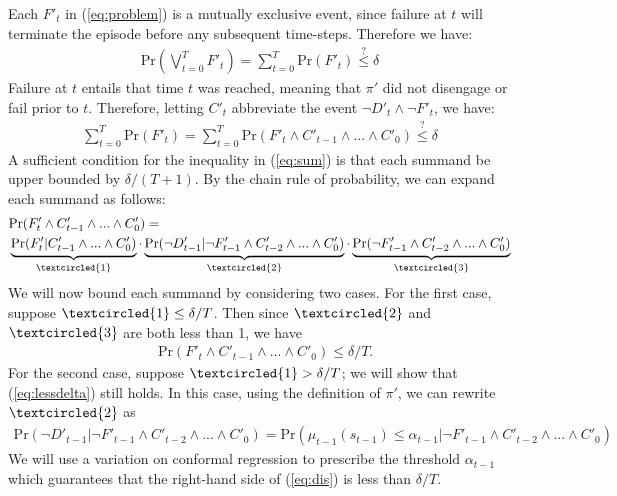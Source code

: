 \documentclass[12pt,letterpaper]{article}
\begin{document}
Each $F'_t$ in (\ref{eq:problem}) is a mutually exclusive event, since failure at $t$ will terminate the episode before any subsequent time-steps.  Therefore we have:
\begin{align}
\text{Pr}\left(\bigvee_{t=0}^T F'_t\right) = \sum_{t=0}^T \text{Pr}(F'_t) \overset{?}{\leq} \delta
\end{align}
Failure at $t$ entails that time $t$ was reached, meaning that $\pi'$ did not disengage or fail prior to $t$.  Therefore, letting $C'_t$ abbreviate the event $\neg D'_t\wedge\neg F'_t$, we have:
\begin{align}
\sum_{t=0}^T \text{Pr}(F'_t) = \sum_{t=0}^T \text{Pr}(F'_t \wedge  C'_{t-1}\wedge ... \wedge C'_0) \overset{?}{\leq} \delta\label{eq:sum}
\end{align}
A sufficient condition for the inequality in (\ref{eq:sum}) is that each summand be upper bounded by $\delta/(T+1)$.  By the chain rule of probability, we can expand each summand as follows:
\begin{align}
&\text{Pr}(F'_t \wedge  C'_{t-1}\wedge ... \wedge C'_0) = \\
& \underbrace{\text{Pr}(F'_t |  C'_{t-1}\wedge ... \wedge C'_0)}_{\textcircled{1}} \cdot \underbrace{\text{Pr}(\neg D'_{t-1}| \neg F'_{t-1}\wedge  C'_{t-2}\wedge ... \wedge C'_0)}_{\textcircled{2}} \cdot \underbrace{\text{Pr}(\neg F'_{t-1}\wedge  C'_{t-2}\wedge ... \wedge C'_0)}_{\textcircled{3}}
\end{align}
We will now bound each summand by considering two cases.  For the first case, suppose $\textcircled{1}\leq\delta/T$. Then since $\textcircled{2}$ and $\textcircled{3}$ are both less than 1, we have
\begin{align}
&\text{Pr}(F'_t \wedge  C'_{t-1}\wedge ... \wedge C'_0) \leq \delta/T.\label{eq:lessdelta}
\end{align}
For the second case, suppose $\textcircled{1}>\delta/T$; we will show that (\ref{eq:lessdelta}) still holds.  In this case, using the definition of $\pi'$, we can rewrite $\textcircled{2}$ as 
\begin{align}
\text{Pr}(\neg D'_{t-1}| \neg F'_{t-1}\wedge  C'_{t-2}\wedge ... \wedge C'_0) = \text{Pr}(\mu_{t-1}(s_{t-1}) \leq \alpha_{t-1}| \neg F'_{t-1}\wedge  C'_{t-2}\wedge ... \wedge C'_0)\label{eq:dis}
\end{align}
We will use a variation on conformal regression to prescribe the threshold $\alpha_{t-1}$ which guarantees that the right-hand side of (\ref{eq:dis}) is less than $\delta/T$.
\end{document}
